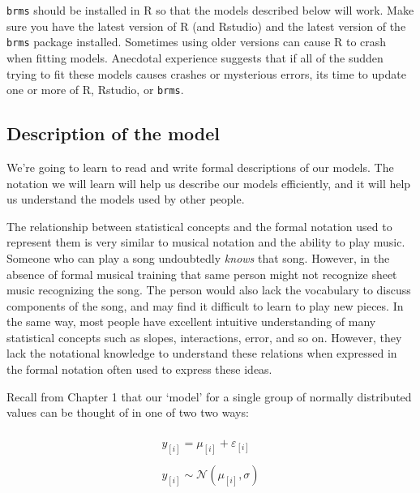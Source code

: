 \documentclass[
]{book}
\begin{document}
\texttt{brms} should be installed in R so that the models described below will work. Make sure you have the latest version of R (and Rstudio) and the latest version of the \texttt{brms} package installed. Sometimes using older versions can cause R to crash when fitting models. Anecdotal experience suggests that if all of the sudden trying to fit these models causes crashes or mysterious errors, its time to update one or more of R, Rstudio, or \texttt{brms}.

\hypertarget{description-of-the-model}{%
\subsection{Description of the model}\label{description-of-the-model}}

We're going to learn to read and write formal descriptions of our models. The notation we will learn will help us describe our models efficiently, and it will help us understand the models used by other people.

The relationship between statistical concepts and the formal notation used to represent them is very similar to musical notation and the ability to play music. Someone who can play a song undoubtedly \emph{knows} that song. However, in the absence of formal musical training that same person might not recognize sheet music recognizing the song. The person would also lack the vocabulary to discuss components of the song, and may find it difficult to learn to play new pieces. In the same way, most people have excellent intuitive understanding of many statistical concepts such as slopes, interactions, error, and so on. However, they lack the notational knowledge to understand these relations when expressed in the formal notation often used to express these ideas.

Recall from Chapter 1 that our `model' for a single group of normally distributed values can be thought of in one of two two ways:

\begin{equation}
\begin{split}
\\
y_{[i]} = \mu_{[i]} + \varepsilon_{[i]} \\ \\
y_{[i]} \sim \mathcal{N}(\mu_{[i]},\sigma) \\ \\
\end{split}
\label{eq:21}
\end{equation}
\end{document}
